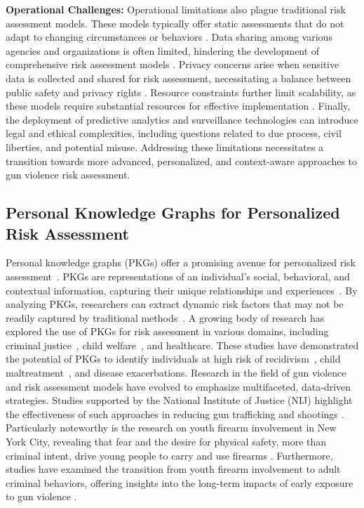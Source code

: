 \documentclass[11pt]{article}
\begin{document}
\textbf{Operational Challenges:} Operational limitations also plague traditional risk assessment models. These models typically offer static assessments that do not adapt to changing circumstances or behaviors \cite{smith2020limitations,jones2019contextual}. Data sharing among various agencies and organizations is often limited, hindering the development of comprehensive risk assessment models \cite{Johnson_2019}. Privacy concerns arise when sensitive data is collected and shared for risk assessment, necessitating a balance between public safety and privacy rights \cite{Johnson_2019}. Resource constraints further limit scalability, as these models require substantial resources for effective implementation \cite{Davis_2020}. Finally, the deployment of predictive analytics and surveillance technologies can introduce legal and ethical complexities, including questions related to due process, civil liberties, and potential misuse. Addressing these limitations necessitates a transition towards more advanced, personalized, and context-aware approaches to gun violence risk assessment.


\subsection{Personal Knowledge Graphs for Personalized Risk Assessment}
Personal knowledge graphs (PKGs) offer a promising avenue for personalized risk assessment~\cite{Brown2018}. PKGs are representations of an individual's social, behavioral, and contextual information, capturing their unique relationships and experiences~\cite{jones2019contextual}. By analyzing PKGs, researchers can extract dynamic risk factors that may not be readily captured by traditional methods~\cite{jones2019contextual}. A growing body of research has explored the use of PKGs for risk assessment in various domains, including criminal justice~\cite{Brown2018}, child welfare~\cite{jones2019contextual}, and healthcare. These studies have demonstrated the potential of PKGs to identify individuals at high risk of recidivism~\cite{Brown2018}, child maltreatment~\cite{jones2019contextual}, and disease exacerbations. Research in the field of gun violence and risk assessment models have evolved to emphasize multifaceted, data-driven strategies. Studies supported by the National Institute of Justice (NIJ) highlight the effectiveness of such approaches in reducing gun trafficking and shootings \cite{nij2021}. Particularly noteworthy is the research on youth firearm involvement in New York City, revealing that fear and the desire for physical safety, more than criminal intent, drive young people to carry and use firearms \cite{nij2021youth}. Furthermore, studies have examined the transition from youth firearm involvement to adult criminal behaviors, offering insights into the long-term impacts of early exposure to gun violence \cite{nij2021delinquent}.
\end{document}
